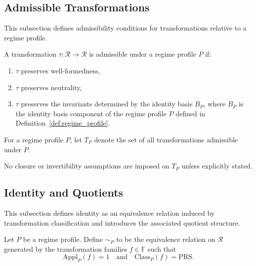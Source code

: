 \subsection{Admissible Transformations}
\label{subsec:admissible_transformations}

This subsection defines admissibility conditions
for transformations relative to a regime profile.

\begin{definition}
  \label{def:admissible_transformation}
  A transformation $\tau : \mathcal{R} \to \mathcal{R}$ is admissible under a regime profile $P$ if:
  \begin{enumerate}
    \item $\tau$ preserves well-formedness,
    \item $\tau$ preserves neutrality,
    \item $\tau$ preserves the invariants determined by the identity basis $B_P$,
      where $B_P$ is the identity basis component of the regime profile $P$
      defined in Definition~\ref{def:regime_profile}.
  \end{enumerate}
\end{definition}

\begin{definition}
  \label{def:admissible_transformation_class}
  For a regime profile $P$, let $T_P$ denote the set of all transformations
  admissible under $P$.
\end{definition}


  No closure or invertibility assumptions are imposed on $T_P$
  unless explicitly stated.


\subsection{Identity and Quotients}
\label{subsec:identity_quotients}

This subsection defines identity as an equivalence relation induced by
transformation classification and introduces the associated quotient structure.

\begin{definition}
  \label{def:induced_identity}
  Let $P$ be a regime profile.
  Define $\sim_P$ to be the equivalence relation on $\mathcal{R}$
  generated by the transformation families $f \in \mathbb{F}$ such that
  \[
    \mathrm{Appl}_P(f)=1
    \quad\text{and}\quad
    \mathrm{Class}_P(f)=\mathrm{PRS}.
  \]
\end{definition}

